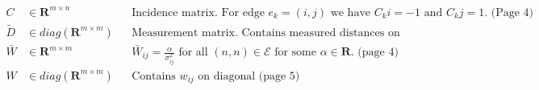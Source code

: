 \documentclass{article}
\begin{document}
\begin{align*}
    C&\in \mathbf{R}^{m \times n} 
    &&
    \text{Incidence matrix. For edge $e_k = (i, j)$ we have $C_ki = -1$ and $C_kj = 1$. (Page 4)} 
    \\
    \tilde{D} &\in diag(\mathbf{R}^{m \times m} )
    &&
    \text{Measurement matrix. Contains measured distances on diagonal. THIS MIGHT BE WRONG? Maybe this is PSD, not diag somehow? (Page 5)}
    \\ 
    \bar{W} &\in \mathbf{R}^{m \times m}
    &&
    \bar{W}_{ij} = \frac{\alpha}{\sigma_{ij}^2} \text{ for all $(n, n) \in \mathcal{E}$ for some $\alpha \in \mathbf{R}$. (page 4)}
    \\
    W &\in diag(\mathbf{R}^{m \times m})
    &&
    \text{Contains $w_{ij}$ on diagonal (page 5)}
\end{align*}
\end{document}
